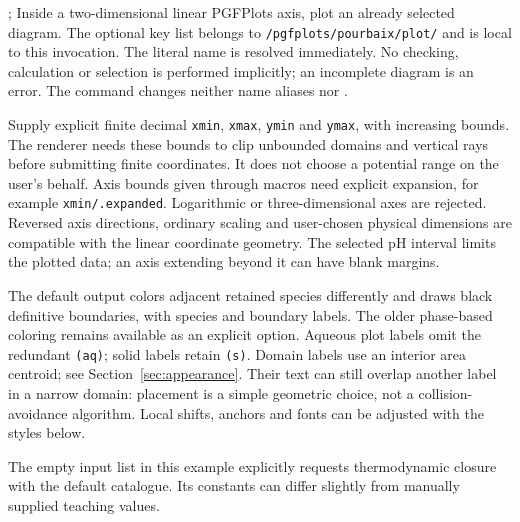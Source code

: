 \documentclass[a4paper,11pt]{ltxdoc}
\begin{document}
\begin{command}{\addpourbaix{};}
Inside a two-dimensional linear PGFPlots axis, plot an already selected diagram.
The optional key list belongs to \texttt{/pgfplots/pourbaix/plot/} and is local to
this invocation. The literal name is resolved immediately. No checking,
calculation or selection is performed implicitly; an incomplete diagram is an
error. The command changes neither name aliases nor .
\end{command}

Supply explicit finite decimal \texttt{xmin}, \texttt{xmax}, \texttt{ymin} and
\texttt{ymax}, with increasing bounds. The renderer needs these bounds to clip
unbounded domains and vertical rays before submitting finite coordinates.
It does not choose a potential range on the user's behalf. Axis bounds given
through macros need explicit expansion, for example \texttt{xmin/.expanded}.
Logarithmic or three-dimensional axes are rejected. Reversed axis directions,
ordinary scaling and user-chosen physical dimensions are compatible with the
linear coordinate geometry. The selected pH interval limits the plotted data;
an axis extending beyond it can have blank margins.

The default output colors adjacent retained species differently and draws black
definitive boundaries, with species and boundary labels. The older phase-based
coloring remains available as an explicit option. Aqueous plot labels omit the redundant \texttt{(aq)}; solid labels retain
\texttt{(s)}. Domain labels use an interior area centroid; see Section~\ref{sec:appearance}.
Their text can still overlap another label in a narrow domain: placement is a
simple geometric choice, not a collision-avoidance algorithm. Local shifts,
anchors and fonts can be adjusted with the styles below.

\begin{codeexample}[width=8cm]
\end{codeexample}
The empty input list in this example explicitly requests thermodynamic closure
with the default catalogue. Its constants can differ slightly from manually
supplied teaching values.
\end{document}
